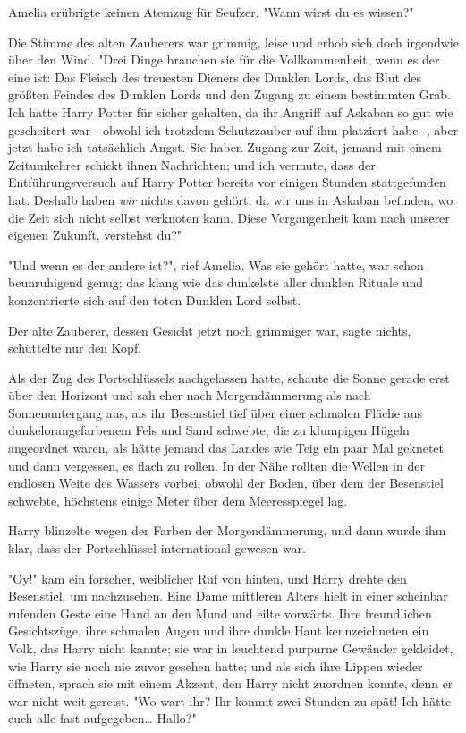 {Amelia erübrigte keinen Atemzug für Seufzer. "Wann wirst du es wissen?"

Die Stimme des alten Zauberers war grimmig, leise und erhob sich doch irgendwie über den Wind. "Drei Dinge brauchen sie für die Vollkommenheit, wenn es der eine ist: Das Fleisch des treuesten Dieners des Dunklen Lords, das Blut des größten Feindes des Dunklen Lords und den Zugang zu einem bestimmten Grab. Ich hatte Harry Potter für sicher gehalten, da ihr Angriff auf Askaban so gut wie gescheitert war - obwohl ich trotzdem Schutzzauber auf ihm platziert habe -, aber jetzt habe ich tatsächlich Angst. Sie haben Zugang zur Zeit, jemand mit einem Zeitumkehrer schickt ihnen Nachrichten; und ich vermute, dass der Entführungsversuch auf Harry Potter bereits vor einigen Stunden stattgefunden hat. Deshalb haben \emph{wir} nichts davon gehört, da wir uns in Askaban befinden, wo die Zeit sich nicht selbst verknoten kann. Diese Vergangenheit kam nach unserer eigenen Zukunft, verstehst du?"

"Und wenn es der andere ist?", rief Amelia. Was sie gehört hatte, war schon beunruhigend genug; das klang wie das dunkelste aller dunklen Rituale und konzentrierte sich auf den toten Dunklen Lord selbst.

Der alte Zauberer, dessen Gesicht jetzt noch grimmiger war, sagte nichts, schüttelte nur den Kopf.

Als der Zug des Portschlüssels nachgelassen hatte, schaute die Sonne gerade erst über den Horizont und sah eher nach Morgendämmerung als nach Sonnenuntergang aus, als ihr Besenstiel tief über einer schmalen Fläche aus dunkelorangefarbenem Fels und Sand schwebte, die zu klumpigen Hügeln angeordnet waren, als hätte jemand das Landes wie Teig ein paar Mal geknetet und dann vergessen, es flach zu rollen. In der Nähe rollten die Wellen in der endlosen Weite des Wassers vorbei, obwohl der Boden, über dem der Besenstiel schwebte, höchstens einige Meter über dem Meeresspiegel lag.

Harry blinzelte wegen der Farben der Morgendämmerung, und dann wurde ihm klar, dass der Portschlüssel international gewesen war.

"Oy!" kam ein forscher, weiblicher Ruf von hinten, und Harry drehte den Besenstiel, um nachzusehen. Eine Dame mittleren Alters hielt in einer scheinbar rufenden Geste eine Hand an den Mund und eilte vorwärts. Ihre freundlichen Gesichtszüge, ihre schmalen Augen und ihre dunkle Haut kennzeichneten ein Volk, das Harry nicht kannte; sie war in leuchtend purpurne Gewänder gekleidet, wie Harry sie noch nie zuvor gesehen hatte; und als sich ihre Lippen wieder öffneten, sprach sie mit einem Akzent, den Harry nicht zuordnen konnte, denn er war nicht weit gereist. "Wo wart ihr? Ihr kommt zwei Stunden zu spät! Ich hätte euch alle fast aufgegeben… Hallo?"

}
